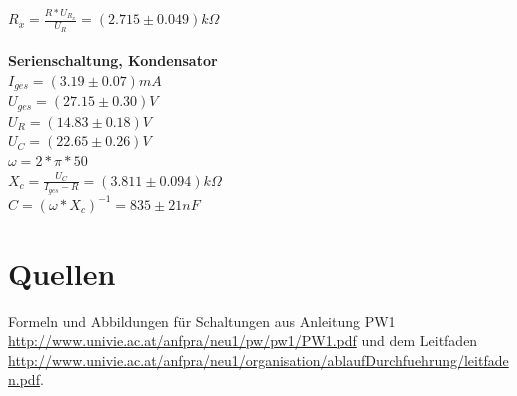 \documentclass[12pt,a4paper]{article}
\begin{document}
\begin{multicols}{2}
$R_{x} = \frac{R*U_{R_{x}}}{U_{R}} = (2.715 \pm 0.049) k\Omega$\\
\\
\textbf{Serienschaltung, Kondensator}\\
$I_{ges} = (3.19 \pm 0.07) mA$\\
$U_{ges} = (27.15 \pm 0.30) V$\\
$U_{R} = (14.83 \pm 0.18) V$\\
$U_{C} = (22.65 \pm 0.26) V$\\
$\omega = 2*\pi *50$ \\
$X_{c} = \frac{U_{C}}{I_{ges} - R} = (3.811 \pm 0.094) k\Omega$ \\
$C = (\omega * X_{c})^{-1} = 835 \pm 21 nF$ \\

\end{multicols}
\section{Quellen}
Formeln und Abbildungen für Schaltungen aus Anleitung PW1 \url{http://www.univie.ac.at/anfpra/neu1/pw/pw1/PW1.pdf} und dem Leitfaden \url{http://www.univie.ac.at/anfpra/neu1/organisation/ablaufDurchfuehrung/leitfaden.pdf}.
\end{document}
